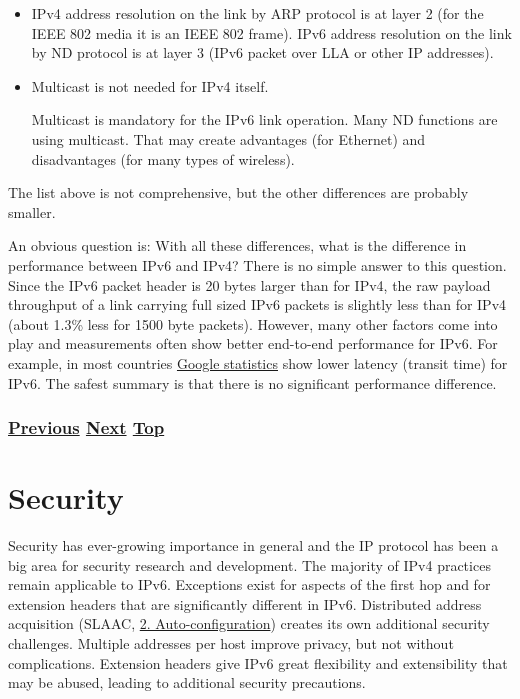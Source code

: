 \documentclass[
]{article}
\begin{document}
\begin{itemize}
  IPv6 fragmentation uses an extension header and is prohibited in
  transit.
\item
  IPv4 address resolution on the link by ARP protocol is at layer 2 (for
  the IEEE 802 media it is an IEEE 802 frame). IPv6 address resolution
  on the link by ND protocol is at layer 3 (IPv6 packet over LLA or
  other IP addresses).
\item
  Multicast is not needed for IPv4 itself.

  Multicast is mandatory for the IPv6 link operation. Many ND functions
  are using multicast. That may create advantages (for Ethernet) and
  disadvantages (for many types of wireless).
\end{itemize}

The list above is not comprehensive, but the other differences are
probably smaller.

An obvious question is: With all these differences, what is the
difference in performance between IPv6 and IPv4? There is no simple
answer to this question. Since the IPv6 packet header is 20 bytes larger
than for IPv4, the raw payload throughput of a link carrying full sized
IPv6 packets is slightly less than for IPv4 (about 1.3\% less for 1500
byte packets). However, many other factors come into play and
measurements often show better end-to-end performance for IPv6. For
example, in most countries
\href{https://www.google.com/intl/en/ipv6/statistics.html\#tab=per-country-ipv6-adoption}{Google
statistics} show lower latency (transit time) for IPv6. The safest
summary is that there is no significant performance difference.

\subsubsection{\texorpdfstring{\hyperref[obsolete-techniques]{Previous}
\hyperref[security]{Next}
\hyperref[coexistence-with-legacy-ipv4]{Top}}{Previous Next Top}}\label{previous-next-top-23}

\pagebreak

\section{Security}\label{security}

Security has ever-growing importance in general and the IP protocol has
been a big area for security research and development. The majority of
IPv4 practices remain applicable to IPv6. Exceptions exist for aspects
of the first hop and for extension headers that are significantly
different in IPv6. Distributed address acquisition (SLAAC,
\hyperref[auto-configuration]{2. Auto-configuration}) creates its own
additional security challenges. Multiple addresses per host improve
privacy, but not without complications. Extension headers give IPv6
great flexibility and extensibility that may be abused, leading to
additional security precautions.
\end{document}
